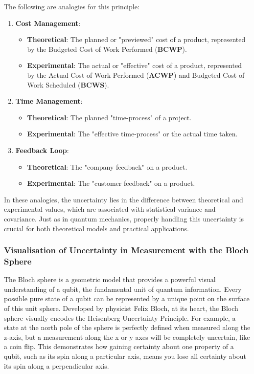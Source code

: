 \documentclass{article}
\begin{document}
 The following are analogies for this principle:
 \begin{enumerate}
 	\item \textbf{Cost Management}:
 	\begin{itemize}
 		\item \textbf{Theoretical}: The planned or "previewed" cost of a product, represented by the Budgeted Cost of Work Performed (\textbf{BCWP}).
 		\item \textbf{Experimental}: The actual or "effective" cost of a product, represented by the Actual Cost of Work Performed (\textbf{ACWP}) and Budgeted Cost of Work Scheduled (\textbf{BCWS}).
 	\end{itemize}
 	\item \textbf{Time Management}:
 	\begin{itemize}
 		\item \textbf{Theoretical}: The planned "time-process" of a project.
 		\item \textbf{Experimental}: The "effective time-process" or the actual time taken.
 	\end{itemize}
 	\item \textbf{Feedback Loop}:
 	\begin{itemize}
 		\item \textbf{Theoretical}: The "company feedback" on a product.
 		\item \textbf{Experimental}: The "customer feedback" on a product.
 	\end{itemize}
 \end{enumerate}
 In these analogies, the uncertainty lies in the difference between theoretical and experimental values, which are associated with statistical variance and covariance. Just as in quantum mechanics, properly handling this uncertainty is crucial for both theoretical models and practical applications.

 
 \subsubsection*{Visualisation of Uncertainty in Measurement with the Bloch Sphere}
The Bloch sphere is a geometric model that provides a powerful visual understanding of a qubit, the fundamental unit of quantum information. Every possible pure state of a qubit can be represented by a unique point on the surface of this unit sphere. Developed by physicist Felix Bloch, at its heart, the Bloch sphere visually encodes the Heisenberg Uncertainty Principle. For example, a state at the north pole of the sphere is perfectly defined when measured along the z-axis, but a measurement along the x or y axes will be completely uncertain, like a coin flip. This demonstrates how gaining certainty about one property of a qubit, such as its spin along a particular axis, means you lose all certainty about its spin along a perpendicular axis. 
 
\end{document}
